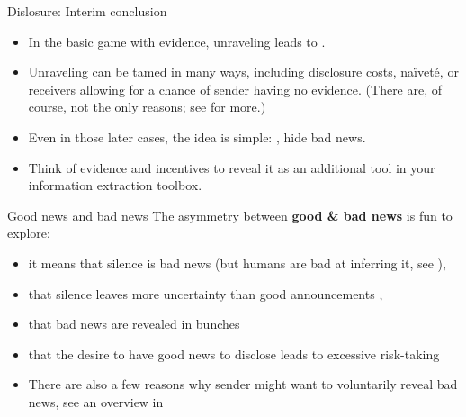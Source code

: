\documentclass[english,10pt
,aspectratio=169
]{beamer}
\begin{document}
\begin{frame}{Dislosure: Interim conclusion}
\begin{itemize}
	\item In the basic game with evidence, unraveling leads to .
	\item Unraveling can be tamed in many ways, including disclosure costs, na{\"i}vet{\'e}, or receivers allowing for a chance of sender having no evidence. (There are, of course, not the only reasons; see \cite{dranove_quality_2010} for more.)
	\item Even in those later cases, the idea is simple: , \alert{hide bad news}.
	\item Think of evidence and incentives to reveal it as an additional tool in your information extraction toolbox.
\end{itemize}
\end{frame}


\begin{frame}{Good news and bad news}
	The asymmetry between \textbf{good \& bad news} is fun to explore:
	\begin{itemize}[<+->]
		\item it means that \alert{silence is bad news} (but humans are bad at inferring it, see \cite*{jin_is_2021}), 
		\item that \alert{silence leaves more uncertainty} than good announcements \citep{shin_disclosures_2003}, 
		\item that bad news are revealed in \alert{bunches} \citep*{acharya_endogenous_2011}
		\item that the desire to have good news to disclose leads to \alert{excessive risk-taking} \citep*{ben-porath_disclosure_2018} %
		
		\bigskip 
		\item There are also a few reasons why sender might want to voluntarily reveal bad news, see an overview in \cite{smirnov_bad_2022}
	\end{itemize}
\end{frame}


\end{document}
